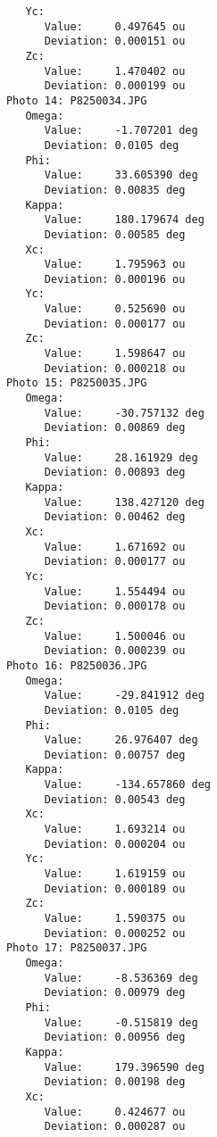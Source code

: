 \documentclass{article}
\begin{document}
\begin{verbatim}
               Yc:
                  Value:     0.497645 ou
                  Deviation: 0.000151 ou
               Zc:
                  Value:     1.470402 ou
                  Deviation: 0.000199 ou
            Photo 14: P8250034.JPG
               Omega:
                  Value:     -1.707201 deg
                  Deviation: 0.0105 deg
               Phi:
                  Value:     33.605390 deg
                  Deviation: 0.00835 deg
               Kappa:
                  Value:     180.179674 deg
                  Deviation: 0.00585 deg
               Xc:
                  Value:     1.795963 ou
                  Deviation: 0.000196 ou
               Yc:
                  Value:     0.525690 ou
                  Deviation: 0.000177 ou
               Zc:
                  Value:     1.598647 ou
                  Deviation: 0.000218 ou
            Photo 15: P8250035.JPG
               Omega:
                  Value:     -30.757132 deg
                  Deviation: 0.00869 deg
               Phi:
                  Value:     28.161929 deg
                  Deviation: 0.00893 deg
               Kappa:
                  Value:     138.427120 deg
                  Deviation: 0.00462 deg
               Xc:
                  Value:     1.671692 ou
                  Deviation: 0.000177 ou
               Yc:
                  Value:     1.554494 ou
                  Deviation: 0.000178 ou
               Zc:
                  Value:     1.500046 ou
                  Deviation: 0.000239 ou
            Photo 16: P8250036.JPG
               Omega:
                  Value:     -29.841912 deg
                  Deviation: 0.0105 deg
               Phi:
                  Value:     26.976407 deg
                  Deviation: 0.00757 deg
               Kappa:
                  Value:     -134.657860 deg
                  Deviation: 0.00543 deg
               Xc:
                  Value:     1.693214 ou
                  Deviation: 0.000204 ou
               Yc:
                  Value:     1.619159 ou
                  Deviation: 0.000189 ou
               Zc:
                  Value:     1.590375 ou
                  Deviation: 0.000252 ou
            Photo 17: P8250037.JPG
               Omega:
                  Value:     -8.536369 deg
                  Deviation: 0.00979 deg
               Phi:
                  Value:     -0.515819 deg
                  Deviation: 0.00956 deg
               Kappa:
                  Value:     179.396590 deg
                  Deviation: 0.00198 deg
               Xc:
                  Value:     0.424677 ou
                  Deviation: 0.000287 ou

\end{verbatim}
\end{document}
